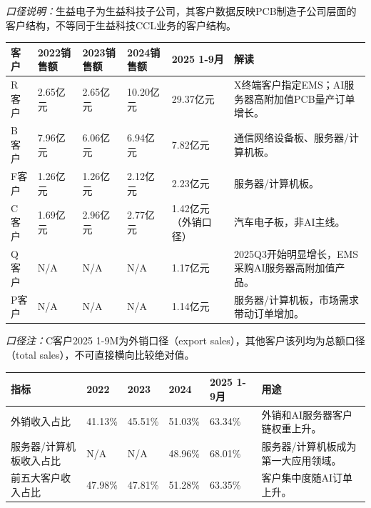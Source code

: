 \begin{exhibitbox}[图表5-6：生益电子匿名AI服务器客户桥]
\footnotesize
\textit{口径说明：}生益电子为生益科技子公司，其客户数据反映PCB制造子公司层面的客户结构，不等同于生益科技CCL业务的客户结构。
\par\vspace{0.6em}
\begin{tabularx}{\textwidth}{L{1.8cm}R{1.6cm}R{1.7cm}R{1.8cm}R{1.9cm}>{\raggedright\arraybackslash}X}
\toprule
\textbf{客户} & \textbf{2022销售额} & \textbf{2023销售额} & \textbf{2024销售额} & \textbf{2025 1-9月} & \textbf{解读} \\
\midrule
R客户 & 2.65亿元 & 2.65亿元 & 10.20亿元 & 29.37亿元 & X终端客户指定EMS；AI服务器高附加值PCB量产订单增长。 \\
B客户 & 7.96亿元 & 6.06亿元 & 6.94亿元 & 7.82亿元 & 通信网络设备板、服务器/计算机板。 \\
F客户 & 1.26亿元 & 1.26亿元 & 2.12亿元 & 2.23亿元 & 服务器/计算机板。 \\
C客户 & 1.69亿元 & 2.96亿元 & 2.77亿元 & 1.42亿元（外销口径） & 汽车电子板，非AI主线。 \\
Q客户 & N/A & N/A & N/A & 1.17亿元 & 2025Q3开始明显增长，EMS采购AI服务器高附加值产品。 \\
P客户 & N/A & N/A & N/A & 1.14亿元 & 服务器/计算机板，市场需求带动订单增加。 \\
\bottomrule
\end{tabularx}
\par\vspace{0.6em}
\textit{口径注：}C客户2025 1-9M为外销口径（export sales），其他客户该列均为总额口径（total sales），不可直接横向比较绝对值。
\begin{tabularx}{\textwidth}{L{2.4cm}R{1.7cm}R{1.7cm}R{1.7cm}R{1.7cm}>{\raggedright\arraybackslash}X}
\toprule
\textbf{指标} & \textbf{2022} & \textbf{2023} & \textbf{2024} & \textbf{2025 1-9月} & \textbf{用途} \\
\midrule
外销收入占比 & 41.13\% & 45.51\% & 51.03\% & 63.34\% & 外销和AI服务器客户链权重上升。 \\
服务器/计算机板收入占比 & N/A & N/A & 48.96\% & 68.01\% & 服务器/计算机板成为第一大应用领域。 \\
前五大客户收入占比 & 47.98\% & 47.81\% & 51.28\% & 63.35\% & 客户集中度随AI订单上升。 \\
\bottomrule
\end{tabularx}
\end{exhibitbox}

